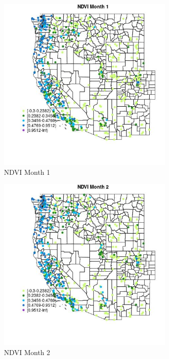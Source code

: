\begin{figure} 
\centering  
\includegraphics[width=0.77\textwidth]{Code_Outputs/Report_ML_input_PM25_Step4_part_f_de_duplicated_aves_prioritize_24hr_obswNAs_MapObsMo1NDVI.jpg} 
\caption{\label{fig:Report_ML_input_PM25_Step4_part_f_de_duplicated_aves_prioritize_24hr_obswNAsMapObsMo1NDVI}NDVI Month 1} 
\end{figure} 
 

\begin{figure} 
\centering  
\includegraphics[width=0.77\textwidth]{Code_Outputs/Report_ML_input_PM25_Step4_part_f_de_duplicated_aves_prioritize_24hr_obswNAs_MapObsMo2NDVI.jpg} 
\caption{\label{fig:Report_ML_input_PM25_Step4_part_f_de_duplicated_aves_prioritize_24hr_obswNAsMapObsMo2NDVI}NDVI Month 2} 
\end{figure} 
 

